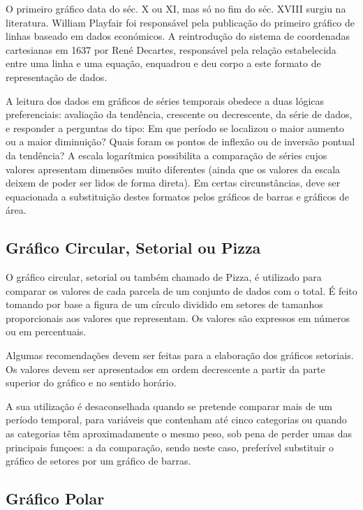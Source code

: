 O primeiro gráfico data do séc. X ou XI, mas só no fim do séc. XVIII surgiu na literatura. William Playfair foi responsável pela publicação do primeiro gráfico de linhas baseado em dados económicos. A reintrodução do sistema de coordenadas cartesianas em 1637 por René Decartes, responsável pela relação estabelecida entre uma linha e uma equação, enquadrou e deu corpo a este formato de representação de dados.\vskip0.3cm

A leitura dos dados em gráficos de séries temporais obedece a duas lógicas preferenciais: avaliação da tendência, crescente ou decrescente, da série de dados, e responder a perguntas do tipo: Em que período se localizou o maior aumento ou a maior diminuição? Quais foram os pontos de inflexão ou de inversão pontual da tendência? A escala logarítmica possibilita a comparação de séries cujos valores apresentam dimensões muito diferentes (ainda que os valores da escala deixem de poder ser lidos de forma direta). Em certas circunstâncias, deve ser equacionada a substituição destes formatos pelos gráficos de barras e gráficos de área.


\subsection{Gráfico Circular, Setorial ou Pizza}

O gráfico circular, setorial ou também chamado de Pizza, é
utilizado para comparar os valores de cada parcela de um conjunto
de dados com o total. É feito tomando por base a figura de um
círculo dividido em setores de tamanhos proporcionais aos valores
que representam. Os valores são expressos em números ou em percentuais. \vskip0.3cm

Algumas recomendações devem ser feitas para a elaboração dos
gráficos setoriais. Os valores devem ser apresentados em ordem
decrescente a partir da parte superior do gráfico e no sentido
horário.\vskip0.3cm

A sua utilização é desaconselhada quando se pretende comparar mais
de um período temporal, para variáveis que contenham até cinco
categorias ou quando as categorias têm aproximadamente o mesmo
peso, sob pena de perder umas das principais funçoes: a da
comparação, sendo neste caso, preferível substituir o gráfico de
setores por um gráfico de barras.



\subsection{Gráfico Polar}

